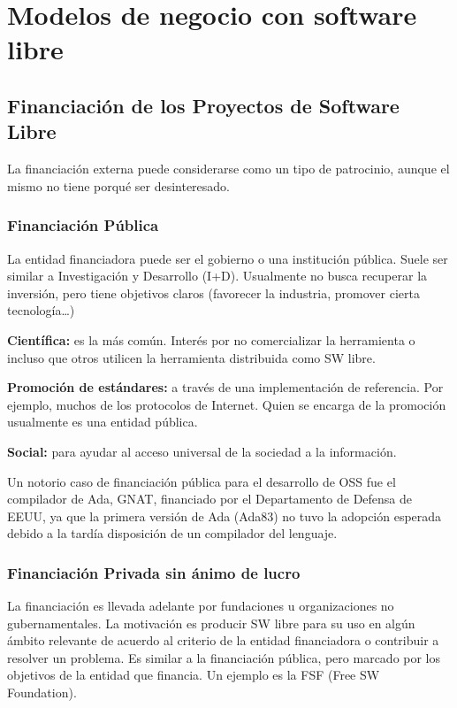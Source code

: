 \chapter{Modelos de negocio con software libre}

\section{Financiación de los Proyectos de Software Libre}

La financiación externa puede considerarse como un tipo de patrocinio, aunque el mismo no tiene porqué ser desinteresado.

\subsection{Financiación Pública}

La entidad financiadora puede ser el gobierno o una institución pública. Suele ser similar a Investigación y Desarrollo (I+D). Usualmente no busca recuperar la inversión, pero tiene objetivos claros (favorecer la industria, promover cierta tecnología…)

{\bf Científica: } es la más común. Interés por no comercializar la herramienta o incluso que otros utilicen la herramienta distribuida como SW libre.

{\bf Promoción de estándares: } a través de una implementación de referencia. Por ejemplo, muchos de los protocolos de Internet. Quien se encarga de la promoción usualmente es una entidad pública.

{\bf Social: } para ayudar al acceso universal de la sociedad a la información. 

Un notorio caso de financiación pública para el desarrollo de OSS fue el compilador de Ada, GNAT, financiado por el Departamento de Defensa de EEUU, ya que la primera versión de Ada (Ada83) no tuvo la adopción esperada debido a la tardía disposición de un compilador del lenguaje.


\subsection{Financiación Privada sin ánimo de lucro}

La financiación es llevada adelante por fundaciones u organizaciones no gubernamentales. La motivación es producir SW libre para su uso en algún ámbito relevante de acuerdo al criterio de la entidad financiadora o contribuir a resolver un problema. Es similar a la financiación pública, pero marcado por los objetivos de la entidad que financia.
Un ejemplo es la FSF (Free SW Foundation).


